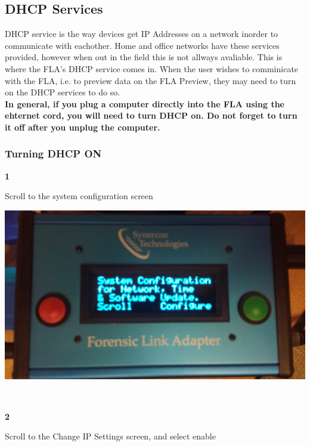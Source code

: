 \documentclass[11pt]{article}
\begin{document}
\subsection{DHCP Services}
\label{subsec:dhcp_services}
DHCP service is the way devices get IP Addresses on a network inorder to communicate with eachother. Home and office networks have these services provided, however when out in the field this is not allways avaliable. This is where the FLA's DHCP service comes in. When the user wishes to comminicate with the FLA, i.e. to preview data on the FLA Preview, they may need to turn on the DHCP services to do so.\\
\textbf{In general, if you plug a computer directly into the FLA using the ehternet cord, you will need to turn DHCP on. Do not forget to turn it off after you unplug the computer.}
\subsubsection{Turning DHCP ON}
\noindent\begin{minipage}{0.3\textwidth}%
\begin{center}
\textbf{1}\\[\baselineskip]
\end{center}
Scroll to the system configuration screen
\end{minipage}%
\hfill%
\begin{minipage}{0.6\textwidth}
\includegraphics[width=\linewidth]{./fla_screens/sys_conf}
\end{minipage}
\\[\baselineskip]
\noindent\begin{minipage}{0.3\textwidth}%
\begin{center}
\textbf{2}\\[\baselineskip]
\end{center}
Scroll to the Change IP Settings screen, and select enable
\end{minipage}%
\end{document}
